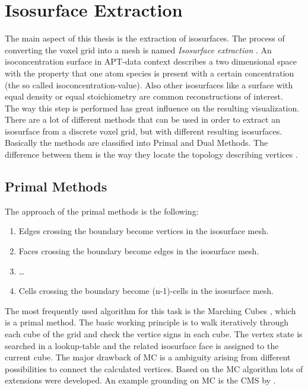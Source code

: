 \section{Isosurface Extraction}
\label{isosurface extraction}

The main aspect of this thesis is the extraction of isosurfaces. The process of converting the voxel grid into a mesh is named \emph{Isosurface extraction} \cite{Len10}. An isoconcentration surface in APT-data context describes a two dimensional space with the property that one atom species is present with a certain concentration (the so called isoconcentration-value). Also other isosurfaces like a surface with equal density or equal stoichiometry are common reconstructions of interest.\\

The way this step is performed has great influence on the resulting visualization. There are a lot of different methods that can be used in order to extract an isosurface from a discrete voxel grid, but with different resulting isosurfaces. Basically the methods are classified into Primal and Dual Methods. The difference between them is the way they locate the topology describing vertices \cite{Lys12}.\\

\subsection{Primal Methods}

The approach of the primal methods is the following\cite{Lys12}:

\begin{enumerate}
    \item Edges crossing the boundary become vertices in the isosurface mesh.
    \item Faces crossing the boundary become edges in the isosurface mesh.
    \item \dots
    \item Cells crossing the boundary become (n-1)-cells in the isosurface mesh.
\end{enumerate}

The most frequently used algorithm for this task is the Marching Cubes \cite{Lor87}\cite{Joh04}, which is a primal method. The basic working principle is to walk iteratively through each cube of the grid and check the vertice signs in each cube. The vertex state is searched in a lookup-table and the related isosurface face is assigned to the current cube. The major drawback of \ac{MC} is a ambiguity arising from different possibilities to connect the calculated vertices.
Based on the \ac{MC} algorithm lots of extensions were developed. An example grounding on \ac{MC} is the \ac{CMS} by \cite{Ho05}.\\

